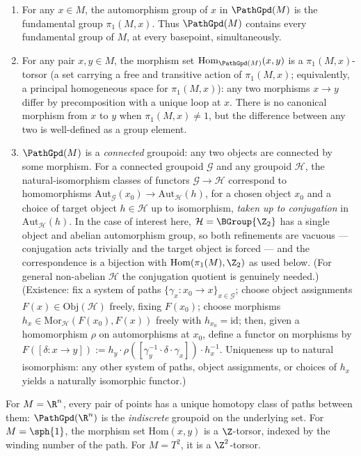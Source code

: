 \begin{enumerate}[label=(\alph*),leftmargin=2em]
\item For any $x\in M$, the automorphism group of $x$ in
$\PathGpd(M)$ is the fundamental group $\pi_1(M,x)$. Thus
$\PathGpd(M)$ contains every fundamental group of $M$, at every
basepoint, simultaneously.

\item For any pair $x,y\in M$, the morphism set
$\mathrm{Hom}_{\PathGpd(M)}(x,y)$ is a $\pi_1(M,x)$-torsor (a set
carrying a free and transitive action of $\pi_1(M,x)$; equivalently,
a principal homogeneous space for $\pi_1(M,x)$): any two
morphisms $x\to y$ differ by precomposition with a unique loop at $x$.
There is no canonical morphism from $x$ to $y$ when $\pi_1(M,x)\neq 1$,
but the difference between any two is well-defined as a group element.

\item $\PathGpd(M)$ is a \emph{connected} groupoid: any two objects are
connected by some morphism. For a connected groupoid $\mathcal{G}$ and
any groupoid $\mathcal{H}$, the natural-isomorphism classes of functors
$\mathcal{G}\to\mathcal{H}$ correspond to homomorphisms
$\mathrm{Aut}_\mathcal{G}(x_0)\to\mathrm{Aut}_\mathcal{H}(h)$, for a
chosen object $x_0$ and a choice of target object $h\in\mathcal{H}$
up to isomorphism, \emph{taken up to conjugation} in
$\mathrm{Aut}_\mathcal{H}(h)$. In the case of interest here,
$\mathcal{H}=\BGroup{\Z_2}$ has a single object and abelian
automorphism group, so both refinements are vacuous --- conjugation
acts trivially and the target object is forced --- and the
correspondence is a bijection with $\mathrm{Hom}(\pi_1(M),\Z_2)$ as
used below. (For general non-abelian $\mathcal{H}$ the conjugation
quotient is genuinely needed.) (Existence: fix a system of paths
$\{\gamma_x\colon x_0\to x\}_{x\in\mathcal{G}}$; choose object
assignments $F(x)\in\mathrm{Obj}(\mathcal{H})$ freely, fixing
$F(x_0)$; choose morphisms
$h_x\in\mathrm{Mor}_\mathcal{H}(F(x_0),F(x))$ freely with
$h_{x_0}=\mathrm{id}$; then, given a homomorphism $\rho$ on
automorphisms at $x_0$, define a functor on morphisms by
$F([\delta\colon x\to y]):=h_y\cdot \rho([\gamma_y^{-1}\cdot
\delta\cdot\gamma_x])\cdot h_x^{-1}$. Uniqueness up to natural
isomorphism: any other system of paths, object assignments, or
choices of $h_x$ yields a naturally isomorphic functor.)
\end{enumerate}

\begin{example}\label{ex:groupoid-examples}
For $M=\R^n$, every pair of points has a unique homotopy class of paths
between them: $\PathGpd(\R^n)$ is the \emph{indiscrete} groupoid on
the underlying set. For $M=\sph{1}$, the morphism set
$\mathrm{Hom}(x,y)$ is a $\Z$-torsor, indexed by the winding number of
the path. For $M=T^2$, it is a $\Z^2$-torsor.
\end{example}

